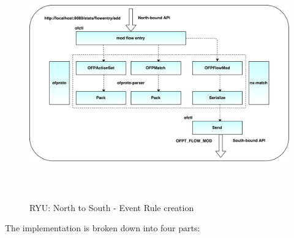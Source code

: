 \begin{figure}[H]
 \centering
 \caption{RYU: North to South - Event Rule creation}
 \includegraphics[height=10cm,width=14cm]{ryu01.pdf}
\end{figure}
The implementation is broken down into four parts:
